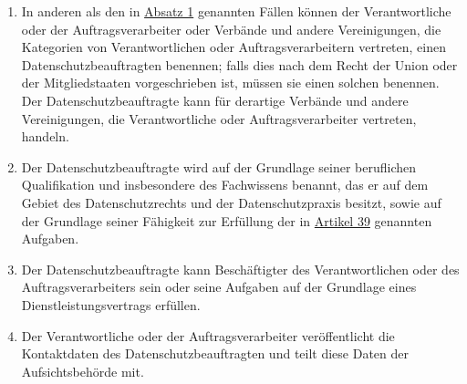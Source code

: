 \begin{enumerate}
  \item In anderen als den in \hyperref[itm:37-1]{Absatz 1} genannten Fällen können der Verantwortliche oder der
   Auftragsverarbeiter oder Verbände und andere Vereinigungen, die Kategorien von Verantwortlichen oder
   Auftragsverarbeitern vertreten, einen Datenschutzbeauftragten benennen; falls dies nach dem Recht der Union oder der
   Mitgliedstaaten vorgeschrieben ist, müssen sie einen solchen benennen. Der Datenschutzbeauftragte kann für derartige
   Verbände und andere Vereinigungen, die Verantwortliche oder Auftragsverarbeiter vertreten, handeln.
  \label{itm:37-4}

  \item Der Datenschutzbeauftragte wird auf der Grundlage seiner beruflichen Qualifikation und insbesondere des
   Fachwissens benannt, das er auf dem Gebiet des Datenschutzrechts und der Datenschutzpraxis besitzt, sowie auf der
   Grundlage seiner Fähigkeit zur Erfüllung der in \hyperref[ch:39]{Artikel 39} genannten Aufgaben.
  \label{itm:37-5}

  \item Der Datenschutzbeauftragte kann Beschäftigter des Verantwortlichen oder des Auftragsverarbeiters sein oder seine
   Aufgaben auf der Grundlage eines Dienstleistungsvertrags erfüllen.
  \label{itm:37-6}

  \item Der Verantwortliche oder der Auftragsverarbeiter veröffentlicht die Kontaktdaten des Datenschutzbeauftragten und
   teilt diese Daten der Aufsichtsbehörde mit.
  \label{itm:37-7}

\end{enumerate}



